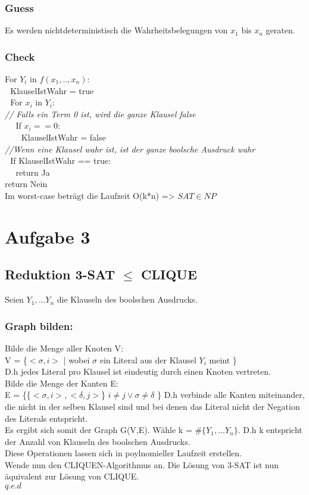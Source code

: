 \documentclass[a4paper,11pt,twoside]{article}
\begin{document}
\subsubsection*{Guess}
Es werden nichtdeterministisch die Wahrheitsbelegungen von $x_1$ bis $x_n$ geraten.
\subsubsection*{Check}

For $Y_i$ in $f(x_1,.., x_n)$:\\
$~~~$KlauselIstWahr = true\\
$~~~$For $x_i$ in $Y_i$:\\
\textit{// Falls ein Term 0 ist, wird die ganze Klausel false}\\
$~~~~~~$If $x_i == 0$:\\ 
$~~~~~~~~~$KlauselIstWahr = false\\
\textit{//Wenn eine Klausel wahr ist, ist der ganze boolsche Ausdruck wahr}\\
$~~~$If KlauselIstWahr == true:\\
$~~~~~~$return Ja\\
return Nein\\

Im worst-case beträgt die Laufzeit O(k*n) => $SAT \in NP$



\section*{Aufgabe 3}
\subsection*{Reduktion 3-SAT $\le$ CLIQUE}
Seien $Y_1, ... Y_n$ die Klauseln des boolschen Ausdrucks.

\subsubsection*{Graph bilden:}
Bilde die Menge aller Knoten V:\\
V = \{$<\sigma, i>$ | wobei $\sigma$ ein Literal aus der Klausel $Y_i$ meint \}\\
D.h jedes Literal pro Klausel ist eindeutig durch einen Knoten vertreten.\\

Bilde die Menge der Kanten E:\\
E = \{\{$<\sigma, i>, <\delta, j>$\} $i \not= j \lor \sigma \not= \delta$ \}
D.h verbinde alle Kanten miteinander, die nicht in der selben Klausel sind und bei denen das Literal nicht der Negation des Literals entspricht.\\

Es ergibt sich somit der Graph G(V,E). Wähle k = $\#\{Y_1, ... Y_n\}$. D.h k entspricht der Anzahl von Klauseln des boolschen Ausdrucks.\\
Diese Operationen lassen sich in poylnomieller Laufzeit erstellen.\\

Wende nun den CLIQUEN-Algorithmus an. Die Lösung von 3-SAT ist nun äquivalent zur Lösung von CLIQUE.\\

$q.e.d$
\end{document}
